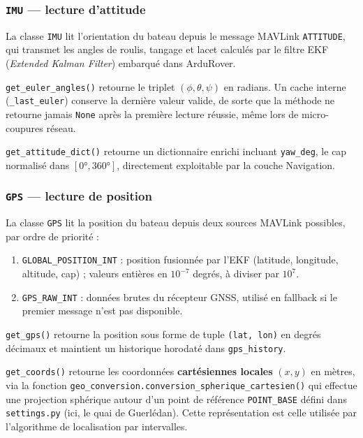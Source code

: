 \subsubsection{\texttt{IMU} — lecture d'attitude}

La classe \texttt{IMU} lit l'orientation du bateau depuis le message MAVLink \texttt{ATTITUDE}, qui transmet les angles de roulis, tangage et lacet calculés par le filtre EKF (\textit{Extended Kalman Filter}) embarqué dans ArduRover.

\texttt{get\_euler\_angles()} retourne le triplet $(\phi, \theta, \psi)$ en radians. Un cache interne (\texttt{\_last\_euler}) conserve la dernière valeur valide, de sorte que la méthode ne retourne jamais \texttt{None} après la première lecture réussie, même lors de micro-coupures réseau.

\texttt{get\_attitude\_dict()} retourne un dictionnaire enrichi incluant \texttt{yaw\_deg}, le cap normalisé dans $[0°, 360°]$, directement exploitable par la couche Navigation.

\subsubsection{\texttt{GPS} — lecture de position}

La classe \texttt{GPS} lit la position du bateau depuis deux sources MAVLink possibles, par ordre de priorité :
\begin{enumerate}
  \item \texttt{GLOBAL\_POSITION\_INT} : position fusionnée par l'EKF (latitude, longitude, altitude, cap) ; valeurs entières en $10^{-7}$ degrés, à diviser par $10^7$.
  \item \texttt{GPS\_RAW\_INT} : données brutes du récepteur GNSS, utilisé en fallback si le premier message n'est pas disponible.
\end{enumerate}

\texttt{get\_gps()} retourne la position sous forme de tuple \texttt{(lat, lon)} en degrés décimaux et maintient un historique horodaté dans \texttt{gps\_history}.

\texttt{get\_coords()} retourne les coordonnées \textbf{cartésiennes locales} $(x, y)$ en mètres, via la fonction \texttt{geo\_conversion.conversion\_spherique\_cartesien()} qui effectue une projection sphérique autour d'un point de référence \texttt{POINT\_BASE} défini dans \texttt{settings.py} (ici, le quai de Guerlédan). Cette représentation est celle utilisée par l'algorithme de localisation par intervalles.

